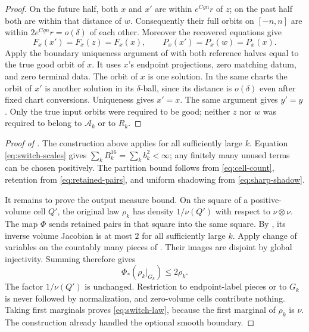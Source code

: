 \begin{proof}
On the future half, both $x$ and $x'$ are within $e^{Cgn}r$ of $z$;
on the past half both are within that distance of $w$.  Consequently
their full orbits on $[-n,n]$ are within $2e^{Cgn}r=o(\delta)$ of
each other.  Moreover the recovered equations give
\[
 F_x(x')=F_x(z)=F_x(x),\qquad
 P_x(x')=P_x(w)=P_x(x).
\]
Apply the boundary uniqueness argument of 
with both reference halves equal to the true good orbit of $x$.
It uses $x$'s endpoint projections, zero matching datum, and zero
terminal data.  The orbit of $x$ is one solution.  In the same charts
the orbit of $x'$ is another solution in its $\delta$-ball, since its
distance is $o(\delta)$ even after fixed chart conversions.  Uniqueness
gives $x'=x$.  The same argument gives $y'=y$.
Only the true input orbits were required to be good; neither $z$ nor
$w$ was required to belong to $\mathcal A_k$ or to $R_k$.
\end{proof}

\begin{proof}[Proof of ]
The construction above applies for all sufficiently large $k$.
Equation \eqref{eq:switch-scales} gives
$\sum_kB_k^{16}=\sum_kb_k^2<\infty$; any finitely many unused terms
can be chosen positively.  The partition bound follows from
\eqref{eq:cell-count}, retention from \eqref{eq:retained-pairs}, and
uniform shadowing from \eqref{eq:sharp-shadow}.

It remains to prove the output measure bound.  On the square of a
positive-volume cell $Q'$, the original law $\rho_k$ has density
$1/\nu(Q')$ with respect to $\nu\otimes\nu$.  The map $\Phi$ sends
retained pairs in that square into the same square.  By
, its inverse volume Jacobian is at most $2$
for all sufficiently large $k$.  Apply change of variables on the
countably many pieces of .  Their images
are disjoint by global injectivity.  Summing therefore gives
\[
 \Phi_*(\rho_k|_{G_k})\le 2\rho_k.
\]
The factor $1/\nu(Q')$ is unchanged.  Restriction to endpoint-label
pieces or to $G_k$ is never followed by normalization, and zero-volume
cells contribute nothing.  Taking first marginals proves
\eqref{eq:switch-law}, because the first marginal of $\rho_k$ is
$\nu$.  The construction already handled the optional smooth boundary.
\end{proof}
